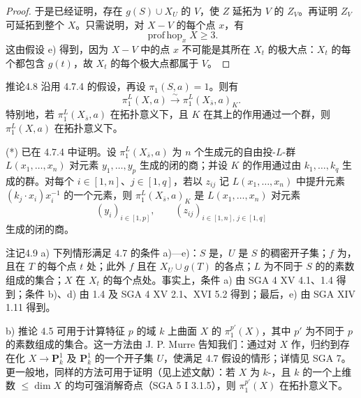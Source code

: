 \begin{proof}
于是已经证明，存在 $g(S)\cup X_U$ 的 $V$，使 $Z$ 延拓为 $V$ 的 $Z_V$。再证明 $Z_V$ 可延拓到整个 $X$。只需说明，对 $X-V$ 的每个点 $x$，有
\[\operatorname{prof\,hop}_xX\geq3.\]
这由假设 e) 得到，因为 $X-V$ 中的点 $x$ 不可能是其所在 $X_t$ 的极大点：$X_t$ 的每个都包含 $g(t)$，故 $X_t$ 的每个极大点都属于 $V$。
\end{proof}

\begin{SGAresult}{推论}{4.8}
沿用 4.7.4 的假设，再设 $\pi_1(S,a)=1$。则有
\[\pi_1^L(X,a)\xrightarrow{\sim}\pi_1^L(X_{\bar s},a)_K.\tag{*}\]
特别地，若 $\pi_1^L(X_{\bar s},a)$ 在拓扑意义下，且 $K$ 在其上的作用通过一个群，则 $\pi_1^L(X,a)$ 在拓扑意义下。
\end{SGAresult}
 (*) 已在 4.7.4 中证明。设 $\pi_1^L(X_{\bar s},a)$ 为 $n$ 个生成元的自由投-$L$-群 $L(x_1,\ldots,x_n)$ 对元素 $y_1,\ldots,y_p$ 生成的闭的商；并设 $K$ 的作用通过由 $k_1,\ldots,k_q$ 生成的群。对每个 $i\in[1,n]$、$j\in[1,q]$，若以 $z_{ij}$ 记 $L(x_1,\ldots,x_n)$ 中提升元素 $(k_j\cdot x_i)x_i^{-1}$ 的一个元素，则 $\pi_1^L(X_{\bar s},a)_K$ 是 $L(x_1,\ldots,x_n)$ 对元素
\[(y_i)_{i\in[1,p]},\qquad (z_{ij})_{i\in[1,n],\,j\in[1,q]}\]
生成的闭的商。

\begin{SGAresult}{注记}{4.9}
a) 下列情形满足 4.7 的条件 a)—e)：$S$ 是，$U$ 是 $S$ 的稠密开子集；$f$ 为，且在 $T$ 的每个点 $t$ 处；此外 $f$ 且在 $X_U\cup g(T)$ 的各点；$L$ 为不同于 $S$ 的的素数组成的集合；$X$ 在 $X_t$ 的每个点处。事实上，条件 a) 由 SGA 4 XV 4.1、1.4 得到；条件 b)、d) 由 1.4 及 SGA 4 XV 2.1、XVI 5.2 得到；最后，e) 由 SGA XIV 1.11 得到。

b) 推论 4.5 可用于计算特征 $p$ 的域 $k$ 上曲面 $X$ 的 $\pi_1^{p'}(X)$，其中 $p'$ 为不同于 $p$ 的素数组成的集合。这一方法由 J. P. Murre 告知我们：通过对 $X$ 作，归约到存在化 $X\to\mathbf P^1_k$ 及 $\mathbf P^1_k$ 的一个开子集 $U$，使满足 4.7 假设的情形；详情见 SGA 7。更一般地，同样的方法可用于证明（见上述文献）：若 $X$ 为 $k$-，且 $k$ 的一个上维数 $\leq\dim X$ 的均可强消解奇点（SGA 5 I 3.1.5），则 $\pi_1^{p'}(X)$ 在拓扑意义下。
\end{SGAresult}

